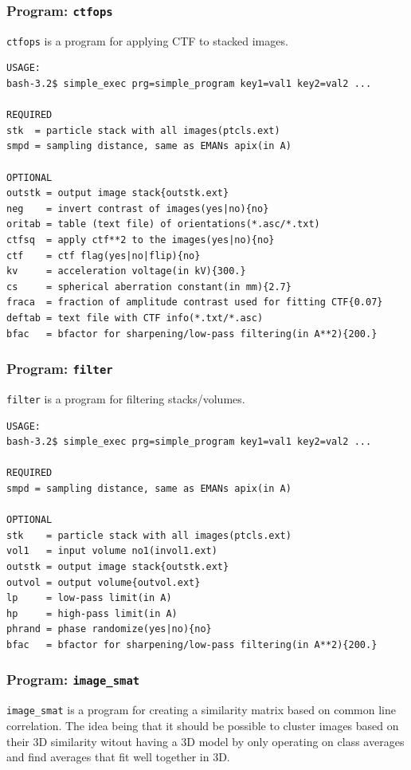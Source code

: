 \documentclass[a4paper,11pt]{article}
\newcommand{\prgname}[1]{\textcolor{NavyBlue}{\texttt{#1}}}
\begin{document}
\subsubsection{Program: \prgname{ctfops}}
\label{ctfops}
\prgname{ctfops} is a program for applying CTF to stacked images.

\begin{verbatim}
USAGE:
bash-3.2$ simple_exec prg=simple_program key1=val1 key2=val2 ...

REQUIRED
stk  = particle stack with all images(ptcls.ext)
smpd = sampling distance, same as EMANs apix(in A)

OPTIONAL
outstk = output image stack{outstk.ext}
neg    = invert contrast of images(yes|no){no}
oritab = table (text file) of orientations(*.asc/*.txt)
ctfsq  = apply ctf**2 to the images(yes|no){no}
ctf    = ctf flag(yes|no|flip){no}
kv     = acceleration voltage(in kV){300.}
cs     = spherical aberration constant(in mm){2.7}
fraca  = fraction of amplitude contrast used for fitting CTF{0.07}
deftab = text file with CTF info(*.txt/*.asc)
bfac   = bfactor for sharpening/low-pass filtering(in A**2){200.}
\end{verbatim}

\subsubsection{Program: \prgname{filter}}
\label{filter}
\prgname{filter} is a program for filtering stacks/volumes.

\begin{verbatim}
USAGE:
bash-3.2$ simple_exec prg=simple_program key1=val1 key2=val2 ...

REQUIRED
smpd = sampling distance, same as EMANs apix(in A)

OPTIONAL
stk    = particle stack with all images(ptcls.ext)
vol1   = input volume no1(invol1.ext)
outstk = output image stack{outstk.ext}
outvol = output volume{outvol.ext}
lp     = low-pass limit(in A)
hp     = high-pass limit(in A)
phrand = phase randomize(yes|no){no}
bfac   = bfactor for sharpening/low-pass filtering(in A**2){200.}
\end{verbatim}

\subsubsection{Program: \prgname{image\_smat}}
\label{image_smat}
\prgname{image\_smat} is a program for creating a similarity matrix based on common line correlation. The idea being that it should be possible to cluster images based on their 3D similarity witout having a 3D model by only operating on class averages and find averages that fit well together in 3D.
\end{document}
